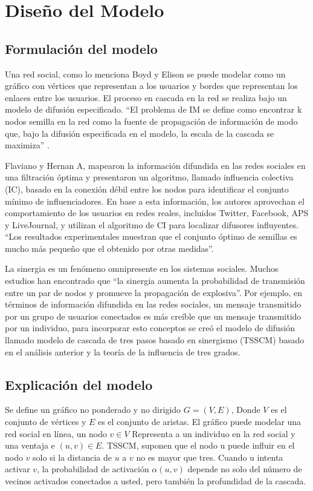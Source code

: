 \documentclass{article}
\begin{document}
\section{Diseño del Modelo}
 
 \subsection{Formulación del modelo}
  Una red social, como lo menciona Boyd y Elison se puede modelar como un gráfico con vértices que representan a los usuarios y bordes que representan los enlaces entre los usuarios. El proceso en cascada en la red se realiza bajo un modelo de difusión especificado.
 “El problema de IM se define como encontrar k nodos semilla en la red como la fuente de  propagación de información de modo que, bajo la difusión especificada en el modelo, la escala  de la cascada se maximiza” \cite{cite:problemaIM}.
 
 Flaviano y Hernan A, mapearon la información difundida en las redes sociales en una  filtración óptima y presentaron un algoritmo, llamado influencia colectiva (IC), basado en la  conexión débil entre los nodos para identificar el conjunto mínimo de influenciadores. En base a  esta información, los autores aprovechan el comportamiento de los usuarios en redes reales,  incluidos Twitter, Facebook, APS y LiveJournal, y utilizan el algoritmo de CI para localizar  difusores influyentes. “Los resultados experimentales muestran que el conjunto óptimo de semillas es mucho más pequeño que el obtenido por otras medidas”\cite{cite:semillas}.
 
 La sinergia es un fenómeno omnipresente en los sistemas sociales. Muchos estudios han encontrado que “la sinergia aumenta la probabilidad de transmisión entre un par de nodos y promueve la propagación de explosiva”\cite{cite:sinergia}. Por ejemplo, en términos de información difundida en las redes sociales, un mensaje transmitido por un grupo de usuarios conectados es más creíble que un mensaje transmitido por un individuo, para incorporar esto conceptos se creó el modelo de difusión llamado modelo de cascada de tres pasos basado en sinergismo (TSSCM) basado en el análisis anterior y la teoría de la influencia de tres grados.
 
\subsection{Explicación del modelo}

Se define un gráfico no ponderado y no dirigido $G = (V,E)$, Donde $V$ es el conjunto de vértices y $E$ es el conjunto de aristas. El gráfico puede modelar una red social en línea, un nodo $v \in V$ Representa a un individuo en la red social y una ventaja e $(u, v) \in E$. TSSCM, suponen que el nodo u puede influir en el nodo $v$ solo si la distancia de $u$ a $v$ no es mayor que tres. Cuando u intenta activar $v$, la probabilidad de activación $\alpha(u, v)$ depende no solo del número de vecinos activados conectados a usted, pero también la profundidad de la cascada.
\end{document}
